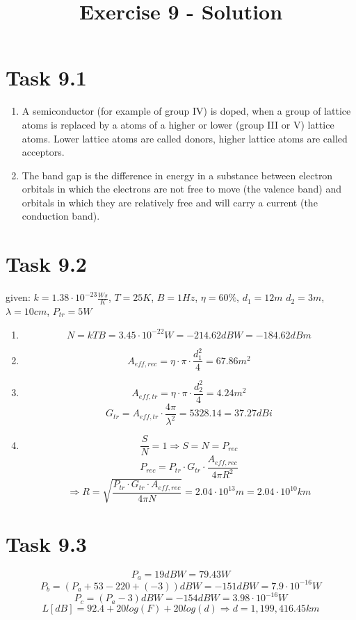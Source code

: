 \documentclass[a4paper,12pt]{article}
\title{Exercise 9 - Solution}
\author{}
\date{}
\begin{document}
\maketitle

\section*{Task 9.1}
\begin{enumerate}
 \item A semiconductor (for example of group IV) is doped, when a group of lattice atoms is replaced by a atoms of a higher or lower (group III
 or V) lattice atoms. Lower lattice atoms are called donors, higher lattice atoms are called acceptors.
 \item The band gap is the difference in energy in a substance between electron orbitals in which the electrons are not free to move (the valence band) 
 and orbitals in which they are relatively free and will carry a current (the conduction band).
\end{enumerate}


\section*{Task 9.2}
given: $k = 1.38\cdot 10^{-23} \frac{Ws}{K}$, $T = 25K$, $B=1Hz$, $\eta = 60\%$, $d_1 = 12m$ $d_2=3m$, $\lambda=10cm$, $P_{tr} = 5W$

\begin{enumerate}
 \item \[N = kTB = 3.45 \cdot 10^{-22}W = -214.62dBW = -184.62dBm\]
 \item \[A_{eff,rec} = \eta\cdot\pi\cdot\frac{d_1^2}{4} = 67.86m^2\]
 \item \[A_{eff,tr} = \eta\cdot\pi\cdot\frac{d_2^2}{4} = 4.24m^2\]
 \[G_{tr} = A_{eff,tr}\cdot \frac{4\pi}{\lambda^2} = 5328.14 = 37.27dBi\]
 \item \[\frac{S}{N}=1 \Rightarrow S=N = P_{rec}\]
 \[P_{rec} = P_{tr}\cdot G_{tr}\cdot \frac{A_{eff,rec}}{4\pi R^2}\]
 \[\Rightarrow R = \sqrt{\frac{P_{tr}\cdot G_{tr}\cdot A_{eff,rec}}{4\pi N}} = 2.04\cdot 10^{13}m = 2.04\cdot 10^{10}km\]
\end{enumerate}

\section*{Task 9.3}
\[P_a = 19dBW = 79.43W\]
\[P_b = (P_a +53-220+(-3))dBW = -151dBW = 7.9\cdot 10^{-16}W\]
\[P_c = (P_a-3)dBW = -154dBW = 3.98\cdot 10^{-16}W\]
\[L[dB] = 92.4 + 20log(F) + 20log(d) \Rightarrow d = 1,199,416.45km\]
\end{document}
